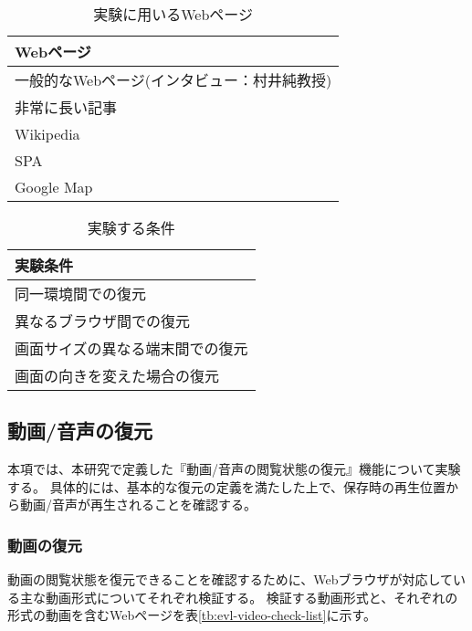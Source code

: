 \begin{table}[htbp]
  \label{tb:evl-basic-web-contents}
  \caption{実験に用いるWebページ}
  \begin{center}
    \begin{tabular}{|l|}
    \hline
    Webページ  \\ \hline
    一般的なWebページ(インタビュー：村井純教授) \\ \hline
    非常に長い記事 \\ \hline
    Wikipedia \\ \hline
    SPA \\ \hline
    Google Map \\ \hline
    \end{tabular}
  \end{center}
\end{table}

\begin{table}[htbp]
  \label{tb:evl-basic-conditions}
  \caption{実験する条件}
  \begin{center}
    \begin{tabular}{|l|}
    \hline
    実験条件  \\ \hline
    同一環境間での復元 \\ \hline
    異なるブラウザ間での復元 \\ \hline
    画面サイズの異なる端末間での復元 \\ \hline
    画面の向きを変えた場合の復元 \\ \hline
    \end{tabular}
  \end{center}
\end{table}

\subsection{動画/音声の復元}
本項では、本研究で定義した『動画/音声の閲覧状態の復元』機能について実験する。
具体的には、基本的な復元の定義を満たした上で、保存時の再生位置から動画/音声が再生されることを確認する。

\subsubsection{動画の復元}
動画の閲覧状態を復元できることを確認するために、Webブラウザが対応している主な動画形式についてそれぞれ検証する。
検証する動画形式と、それぞれの形式の動画を含むWebページを表\ref{tb:evl-video-check-list}に示す。

